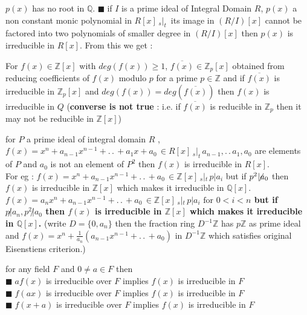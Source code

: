 \documentclass[11pt]{extarticle}
\newcommand{\Z}{\mathbb{Z}}
\newcommand{\Q}{\mathbb{Q}}
\newcommand{\w}[1]{\text{#1}}
\newcommand{\ck}{.\,.\,}
\newcommand{\snote}[1]{{\footnotesize(#1)}}
\newcommand{\st}{\,{}_{s}|_t\,}
\newcommand{\tbx}[2][]{
	\begin{tcolorbox}[enhanced,breakable,size=small,colback=black!2!white,title={#1},arc is angular, arc=1.5mm,drop fuzzy shadow]
		#2
	\end{tcolorbox}
}
\newcommand{\y}{$\blacksquare\;$}
\begin{document}
\begin{multicols}{2}
{{			$ p(x) $  has no root in $ \Q $.}
\y if $ I $ is a prime ideal of Integral Domain $ R $, $ p(x) $ a non constant monic polynomial in $ R[x]\st $ its image in $ (R/I)[x] $ cannot be factored into two polynomials of smaller degree in $ (R/I)[x] $ then $ p(x) $ is irreducible in $ R[x] $. From this we get :}
\tbx[\textbf{Mod $ p $ irreducibility test} ]{For $ f(x)\in \Z[x] $ with $ deg(f(x))\geq 1 $, $ \overline{f(x)} \in \Z_p[x]$ obtained from reducing coefficients of $ f(x) $ modulo $ p $ for a prime $ p\in \Z $ and  if $ \overline{f(x)} $ is irreducible in $ \Z_p[x] $ and $ deg(f(x))=deg(\overline{f(x)}) $ then $ f(x) $ is irreducible in $ Q$  \snote{\textbf{converse is not true} : i.e. if $ \overline{f(x)} $ is reducible in $ \Z_p $ then it may not be reducible in $ \Z[x] $}} 
			
\tbx[\textbf{Eisenstein's Criterion}]{  for $ P $ a prime ideal of integral domain $ R $ , 
			$ f(x)=x^n +a_{n-1}x^{n-1}+\ck + a_1x+a_0 \, \in R[x] \st a_{n-1},\ck a_1,a_0$ are elements of $ P $ and $ a_0 $ is not an element of $ P^2 $ then $ f(x) $ is irreducible in $ R[x] $.\\
			For  eg : $ f(x)=x^n+ a_{n-1}x^{n-1}+\ck + a_0 \, \in \Z[x] \st p|a_i$ but if $ p^2\! \not\!\!| a_0 $ then $ f(x) $ is irreducible in $ \Z[x] $ which makes it irreducible in $ \Q[x] $.\\
			\textbf{$ f(x)=a_n x^n +a_{n-1}x^{n-1}+\ck + a_0 \, \in \Z[x] \st p|a_i \w{ for } 0<i<n$ but if $p\not|a_n, p^2 \not| a_0 $ then $ f(x) $ is irreducible in $ \Z[x] $ which makes it irreducible in $ \Q[x] $.} \snote{write $ D=\{0,a_n\} $ then the fraction ring $ D^{-1}\Z $ has $p\Z $ as prime ideal and $ f(x)  =x^n +\frac{ 1 }{a_n} (a_{n-1}x^{n-1}+\ck + a_0 )$ in $ D^{-1}\Z $ which satisfies original Eisenstiens criterion.}}
			
\tbx{for any field $ F $ and $ 0\neq a\in F $ then \\
\y $ af(x) $ is irreducible over $ F $ implies $ f(x) $ is irreducible in $ F $ \\  
\y $ f(ax) $ is irreducible over $ F $ implies $ f(x) $ is irreducible in $ F $ \\
\y $ f(x+a) $ is irreducible over $ F $ implies $ f(x) $ is irreducible in $ F $ 
}


\end{multicols}
\end{document}
